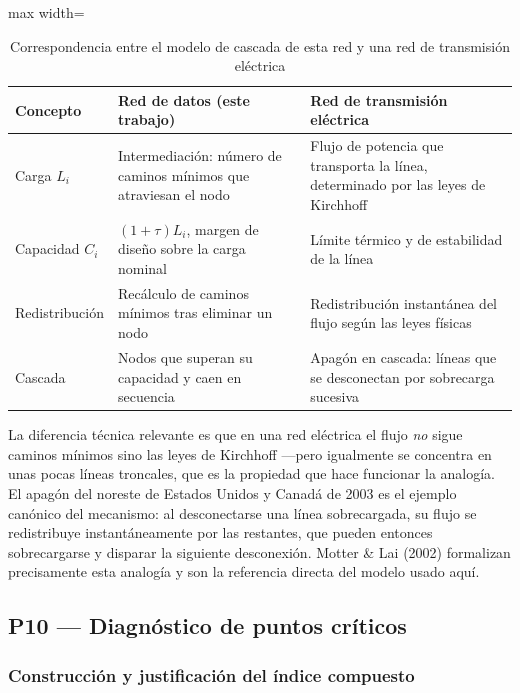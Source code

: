 \documentclass[10pt,a4paper]{extarticle}
\begin{document}
\begin{table}[H]
\centering
\caption{Correspondencia entre el modelo de cascada de esta red y una red de transmisión eléctrica}
\label{tab:analogia}
\small
\begin{adjustbox}{max width=\textwidth}
\begin{tabular}{p{3.4cm}p{5.4cm}p{5.4cm}}
\toprule
\textbf{Concepto} & \textbf{Red de datos (este trabajo)} & \textbf{Red de transmisión eléctrica} \\
\midrule
Carga $L_i$ & Intermediación: número de caminos mínimos que atraviesan el nodo &
Flujo de potencia que transporta la línea, determinado por las leyes de Kirchhoff \\
Capacidad $C_i$ & $(1+\tau)L_i$, margen de diseño sobre la carga nominal &
Límite térmico y de estabilidad de la línea \\
Redistribución & Recálculo de caminos mínimos tras eliminar un nodo &
Redistribución instantánea del flujo según las leyes físicas \\
Cascada & Nodos que superan su capacidad y caen en secuencia &
Apagón en cascada: líneas que se desconectan por sobrecarga sucesiva \\
\bottomrule
\end{tabular}
\end{adjustbox}
\end{table}

La diferencia técnica relevante es que en una red eléctrica el flujo \textit{no} sigue
caminos mínimos sino las leyes de Kirchhoff ---pero igualmente se concentra en unas pocas
líneas troncales, que es la propiedad que hace funcionar la analogía. El apagón del noreste
de Estados Unidos y Canadá de 2003 es el ejemplo canónico del mecanismo: al desconectarse
una línea sobrecargada, su flujo se redistribuye instantáneamente por las restantes, que
pueden entonces sobrecargarse y disparar la siguiente desconexión. Motter \& Lai (2002)
formalizan precisamente esta analogía y son la referencia directa del modelo usado aquí.

\subsection{P10 --- Diagnóstico de puntos críticos}
\label{sec:p10}

\subsubsection{Construcción y justificación del índice compuesto}
\end{document}
